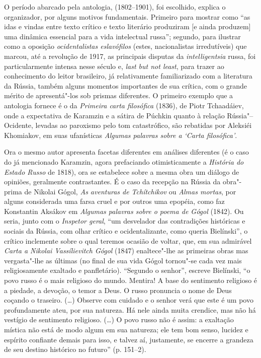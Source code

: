 O período abarcado pela antologia, (1802--1901), foi escolhido, explica o
organizador, por alguns motivos fundamentais. Primeiro para mostrar como
``as idas e vindas entre texto crítico e texto literário produziram [e ainda produzem] uma dinâmica essencial para a vida intelectual
russa''; segundo, para ilustrar como a oposição \emph{ocidentalistas 
eslavófilos} (estes, nacionalistas irredutíveis) que marcou, até a revolução
de 1917, as principais disputas da \emph{intelligentsia} russa, foi
particularmente intensa nesse século e, \emph{last but not least}, para
trazer ao conhecimento do leitor brasileiro, já relativamente
familiarizado com a literatura da Rússia, também alguns momentos
importantes de sua crítica, com o grande mérito de apresentá"-los sob
prismas diferentes. O primeiro exemplo que a antologia fornece é o da \emph{Primeira carta filosófica} (1836), de Piotr Tchaadáiev, onde a
expectativa de Karamzin e a sátira de Púchkin quanto à relação
Rússia"--Ocidente, levadas ao paroxismo pelo tom catastrófico, são
rebatidas por Aleksiéi Khomiakov, em suas ufanísticas \emph{Algumas
palavras sobre a `Carta filosófica'}.

Ora o mesmo autor apresenta facetas diferentes em análises diferentes (é o caso do já mencionado Karamzin, agora prefaciando otimisticamente a
\emph{História do Estado Russo} de 1818), ora se estabelece sobre a
mesma obra um diálogo de opiniões, geralmente contrastantes. É o caso da
recepção na Rússia da obra"-prima de Nikolai Gógol, \emph{As aventuras de Tchítchikov} ou \emph{Almas mortas}, por alguns considerada uma
farsa cruel e por outros uma epopéia, como faz Konstantin Aksákov em
\emph{Algumas palavras sobre o poema de Gógol} (1842). Ou seria, junto com
o \emph{Inspetor geral}, ``um desvelador das contradições históricas e
sociais da Rússia, com olhar crítico e ocidentalizante, como queria
Bielínski'', o crítico inclemente sobre o qual teremos ocasião de
voltar, que, em sua admirável \emph{Carta a Nikolai Vassílievitch Gógol} (1847) enaltece"-lhe as primeiras obras mas vergasta"-lhe as últimas (no
final de sua vida Gógol tornou"-se cada vez mais religiosamente exaltado
e panfletário). ``Segundo o senhor'', escreve Bielínski, ``o povo russo
é o mais religioso do mundo. Mentira! A base do sentimento religioso é a
piedade, a devoção, o temor a Deus. O russo pronuncia o nome de Deus
coçando o traseiro. (\ldots{}) Observe com cuidado e o senhor verá que este é
um povo profundamente ateu, por sua natureza. Há nele ainda muita
crendice, mas não há vestígio de sentimento religioso. (\ldots{}) O povo
russo não é assim: a exaltação mística não está de modo algum em sua
natureza; ele tem bom senso, lucidez e espírito confiante demais para
isso, e talvez aí, justamente, se encerre a grandeza de seu destino
histórico no futuro'' (p. 151--2).

